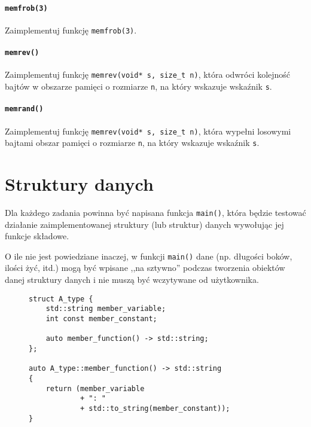 \documentclass[11pt,a4paper,titlepage,onecolumn]{article}
\begin{document}
\paragraph{\texttt{memfrob(3)}} Zaimplementuj funkcję \texttt{memfrob(3)}.

\paragraph{\texttt{memrev()}} Zaimplementuj funkcję \texttt{memrev(void* s,
size\_t n)}, która odwróci kolejność bajtów w obszarze pamięci o rozmiarze
\texttt{n}, na który wskazuje wskaźnik \texttt{s}.

\paragraph{\texttt{memrand()}} Zaimplementuj funkcję \texttt{memrev(void* s,
size\_t n)}, która wypełni losowymi bajtami obszar pamięci o rozmiarze
\texttt{n}, na który wskazuje wskaźnik \texttt{s}.

\newpage
\section{Struktury danych}

Dla każdego zadania powinna być napisana funkcja \texttt{main()}, która będzie
testować działanie zaimplementowanej struktury (lub struktur) danych wywołując
jej funkcje składowe.

O ile nie jest powiedziane inaczej, w funkcji \texttt{main()} dane (np. długości
boków, ilości żyć, itd.) mogą być wpisane ,,na sztywno'' podczas tworzenia
obiektów danej struktury danych i nie muszą być wczytywane od użytkownika.

\begin{figure}[!htp]
{\small
\begin{lstlisting}[caption={struct},
    captionpos=b,
    label=listing_0010_struct]
struct A_type {
    std::string member_variable;
    int const member_constant;

    auto member_function() -> std::string;
};

auto A_type::member_function() -> std::string
{
    return (member_variable
            + ": "
            + std::to_string(member_constant));
}
\end{lstlisting}}
\end{figure}
\end{document}
